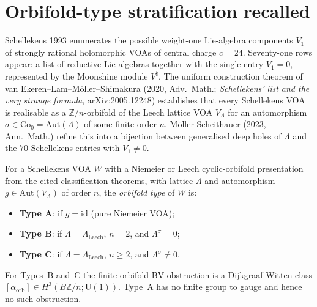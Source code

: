 \section{Orbifold-type stratification recalled}
\label{sec:schellekens-71-stratification-recalled}

Schellekens 1993 enumerates the possible weight-one
Lie-algebra components $V_1$ of strongly rational holomorphic
VOAs of central charge $c = 24$. Seventy-one rows appear: a
list of reductive Lie algebras together with the single entry
$V_1 = 0$, represented by the Moonshine module
$V^\natural$. The uniform construction
theorem of van Ekeren--Lam--M\"oller--Shimakura (2020, Adv.~Math.;
\emph{Schellekens' list and the very strange formula}, arXiv:2005.12248)
establishes that every Schellekens VOA is realisable as a
$\mathbb{Z}/n$-orbifold of the Leech lattice VOA $V_\Lambda$ for an
automorphism $\sigma \in \mathrm{Co}_0 = \mathrm{Aut}(\Lambda)$ of some
finite order $n$. M\"oller-Scheithauer (2023, Ann.~Math.) refine this
into a bijection between generalised deep holes of $\Lambda$ and the
$70$ Schellekens entries with $V_1 \ne 0$.

\begin{definition}
\label{def:schellekens-orbifold-type}
For a Schellekens VOA $W$ with a Niemeier or Leech cyclic-orbifold
presentation from the cited classification theorems, with lattice
$\Lambda$ and automorphism
$g \in \mathrm{Aut}(V_\Lambda)$ of order $n$, the \emph{orbifold type}
of $W$ is:
\begin{itemize}
\item \textbf{Type A}: if $g = \mathrm{id}$ (pure Niemeier VOA);
\item \textbf{Type B}: if $\Lambda = \Lambda_{\mathrm{Leech}}$,
$n = 2$, and $\Lambda^\sigma = 0$;
\item \textbf{Type C}: if $\Lambda = \Lambda_{\mathrm{Leech}}$,
$n \ge 2$, and $\Lambda^\sigma \ne 0$.
\end{itemize}
For Types~B and~C the finite-orbifold BV obstruction is a
Dijkgraaf-Witten class
$[\alpha_{\mathrm{orb}}]\in H^3(B\mathbb{Z}/n;\mathrm{U}(1))$. Type~A
has no finite group to gauge and hence no such obstruction.
\end{definition}

